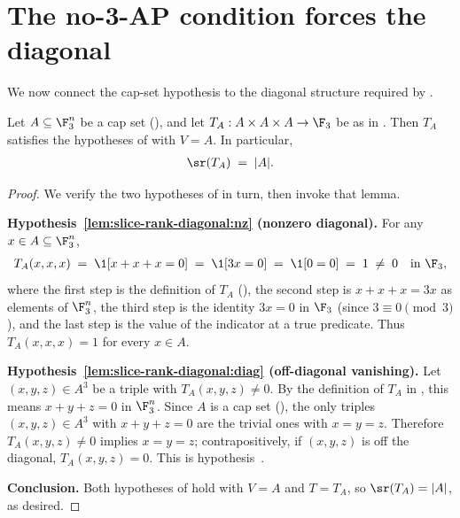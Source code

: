 \section{The no-3-AP condition forces the diagonal}
\label{sec:cap-set-diagonal}

We now connect the cap-set hypothesis to the diagonal structure required by .

\begin{lemma}\label{lem:cap-set-diagonal}
Let $A \subseteq \F_3^n$ be a cap set (), and let $T_A: A \times A \times A \to \F_3$ be as in . Then $T_A$ satisfies the hypotheses of  with $V = A$. In particular,
\begin{align*}
\sr(T_A) \;=\; |A|.
\end{align*}
\end{lemma}

\begin{proof}
We verify the two hypotheses of  in turn, then invoke that lemma.

\textbf{Hypothesis~\ref{lem:slice-rank-diagonal:nz} (nonzero diagonal).} For any $x \in A \subseteq \F_3^n$,
\begin{align*}
T_A(x, x, x) \;=\; \1[x + x + x = 0] \;=\; \1[3x = 0] \;=\; \1[0 = 0] \;=\; 1 \;\ne\; 0 \quad \text{in } \F_3,
\end{align*}
where the first step is the definition of $T_A$ (), the second step is $x + x + x = 3x$ as elements of $\F_3^n$, the third step is the identity $3x = 0$ in $\F_3$ (since $3 \equiv 0 \pmod 3$), and the last step is the value of the indicator at a true predicate. Thus $T_A(x, x, x) = 1$ for every $x \in A$.

\textbf{Hypothesis~\ref{lem:slice-rank-diagonal:diag} (off-diagonal vanishing).} Let $(x, y, z) \in A^3$ be a triple with $T_A(x, y, z) \ne 0$. By the definition of $T_A$ in , this means $x + y + z = 0$ in $\F_3^n$. Since $A$ is a cap set (), the only triples $(x, y, z) \in A^3$ with $x + y + z = 0$ are the trivial ones with $x = y = z$. Therefore $T_A(x, y, z) \ne 0$ implies $x = y = z$; contrapositively, if $(x, y, z)$ is off the diagonal, $T_A(x, y, z) = 0$. This is hypothesis~.

\textbf{Conclusion.} Both hypotheses of  hold with $V = A$ and $T = T_A$, so $\sr(T_A) = |A|$, as desired.
\end{proof}
